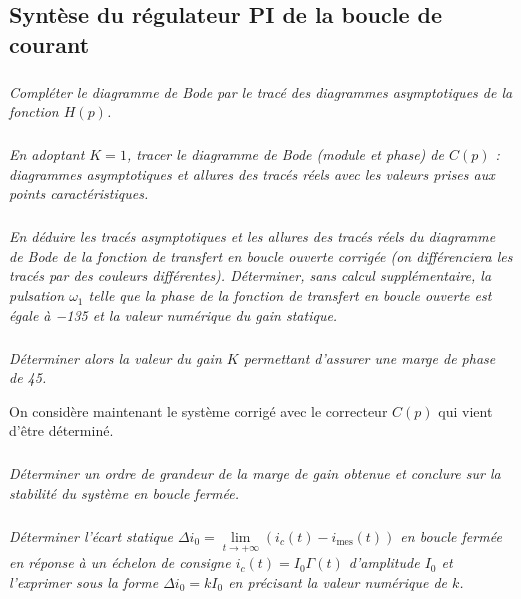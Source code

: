 \begin{multicols}{2}
\subsection*{Syntèse du régulateur PI de la boucle de courant}
\subparagraph{}\textit{Compléter le diagramme de Bode par le tracé des diagrammes asymptotiques de la fonction $H(p)$.}
\ifprof
\begin{corrige}
\end{corrige}
\else
\fi

\subparagraph{}\textit{En adoptant $K = 1$, tracer le diagramme de Bode
(module et phase) de $C(p)$ : diagrammes asymptotiques et allures des tracés réels avec les valeurs prises aux points caractéristiques.}
\ifprof
\begin{corrige}
\end{corrige}
\else
\fi

\subparagraph{}\textit{En déduire les tracés asymptotiques et les allures des tracés réels du diagramme de Bode de la fonction de transfert en boucle ouverte corrigée (on différenciera les tracés par des
couleurs différentes). Déterminer, sans calcul supplémentaire, la pulsation $\omega_1$ telle que la phase de la fonction
de transfert en boucle ouverte est égale à \SI{-135}{\degres} et la valeur numérique du gain statique.
}
\ifprof
\begin{corrige}
\end{corrige}
\else
\fi


\subparagraph{}\textit{Déterminer alors la valeur du gain $K$ permettant d’assurer une marge de phase de 45\degres.}
\ifprof
\begin{corrige}
\end{corrige}
\else
\fi

On considère maintenant le système corrigé avec le correcteur $C(p)$ qui vient d’être déterminé.


\subparagraph{}\textit{Déterminer un ordre de grandeur de la marge de gain obtenue et conclure sur la stabilité du système en
boucle fermée.}
\ifprof
\begin{corrige}
\end{corrige}
\else
\fi


\subparagraph{}\textit{Déterminer l'écart statique $\Delta i_0 = \lim\limits_{t\to +\infty} \left(i_c(t)-i_{\text{mes}}(t)\right)$ en boucle fermée en réponse à un échelon de consigne $i_c(t) = I_0\Gamma(t)$ d’amplitude $I_0$ et l’exprimer sous la forme $\Delta i_0 =  kI_0$ en précisant la valeur numérique de $k$.
}
\ifprof
\begin{corrige}
\end{corrige}
\else
\fi


\end{multicols}
